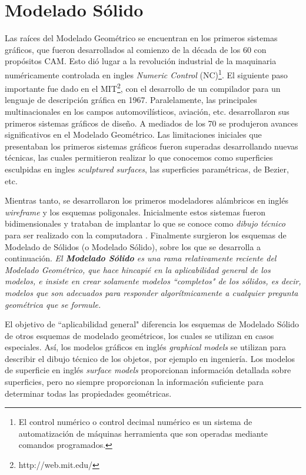 \section{Modelado Sólido}
Las raíces del Modelado Geométrico se encuentran en los primeros sistemas gráficos, que fueron desarrollados al comienzo de la década de los 60 con propósitos CAM. Esto dió lugar a la revolución industrial de la maquinaria numéricamente controlada en ingles \textit{Numeric Control} (NC)\footnote{El control numérico o control decimal numérico es un sistema de automatización de máquinas herramienta que son operadas mediante comandos programados.}.
El siguiente paso importante fue dado en el MIT\footnote{http://web.mit.edu/}, con el desarrollo de un compilador para un lenguaje de descripción gráfica en 1967. Paralelamente, las principales multinacionales en los campos automovilísticos, aviación, etc. desarrollaron sus primeros sistemas gráficos de diseño.
A mediados de los 70 se produjeron avances significativos en el Modelado Geométrico. Las limitaciones iniciales que presentaban los primeros sistemas gráficos fueron superadas desarrollando nuevas técnicas, las cuales permitieron realizar lo que conocemos como superficies esculpidas en ingles \textit{sculptured surfaces}, las superficies paramétricas, de Bezier, etc.

Mientras tanto, se desarrollaron los primeros modeladores alámbricos en inglés \textit{wireframe} y los esquemas poligonales. Inicialmente estos sistemas fueron bidimensionales y trataban de implantar lo que se conoce como \textit{dibujo técnico} para ser realizado con la computadora \citep{Ramos2012}.
Finalmente surgieron los esquemas de Modelado de Sólidos (o Modelado Sólido), sobre los que se desarrolla a continuación.
\textit{El \textbf{Modelado Sólido} es una rama relativamente reciente del Modelado Geométrico, que hace hincapié en la aplicabilidad general de los modelos, e insiste en crear solamente modelos ``completos" de los sólidos, es decir, modelos que son adecuados para responder algorítmicamente a cualquier pregunta geométrica que se formule.} \citep{Ramos2012} 

El objetivo de ``aplicabilidad general" diferencia los esquemas de Modelado Sólido de otros esquemas de modelado geométricos, los cuales se utilizan en casos especiales. Así, los modelos gráficos en inglés \textit{graphical models} se utilizan para describir el dibujo técnico de los objetos, por ejemplo en ingeniería.
Los modelos de superficie en inglés \textit{surface models} proporcionan información detallada sobre superficies, pero no siempre proporcionan la información suficiente para determinar todas las propiedades geométricas. 

